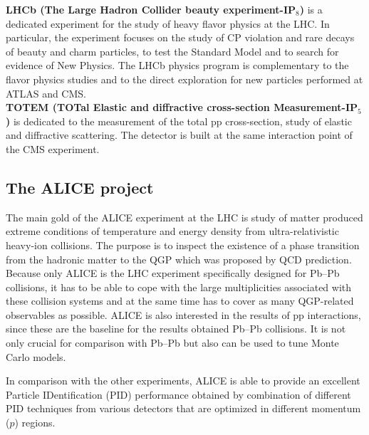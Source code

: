 \textbf{LHCb (The Large Hadron Collider beauty experiment-IP$_{8}$)} \cite{cite:proposalLHCb} is a dedicated experiment for the study of heavy flavor physics at the LHC. In particular, the experiment focuses on the study of CP violation and rare decays of beauty and charm particles, to test the Standard Model and to search for evidence of New Physics. The LHCb physics program is complementary to the flavor physics studies and to the direct exploration for new particles performed at ATLAS and CMS. \\


\textbf{TOTEM (TOTal Elastic and diffractive cross-section Measurement-IP$_{5}$)} \cite{cite:proposalTOTEM} is dedicated to the measurement of the total pp cross-section, study of elastic and diffractive scattering. The detector is built at the same interaction point of the CMS experiment. \\

\subsection{The ALICE project}
The main gold of the ALICE experiment at the LHC \cite{cite:ALICE} is study of matter produced extreme conditions of temperature and energy density from ultra-relativistic heavy-ion collisions. The purpose is to inspect the existence of a phase transition from the hadronic matter to the QGP which was proposed by QCD prediction. Because only ALICE is the LHC experiment specifically designed for Pb--Pb collisions, it has to be able to cope with the large multiplicities associated with these collision systems and at the same time has to cover as many QGP-related observables as possible. ALICE is also interested in the results of pp interactions, since these are the baseline for the results obtained Pb--Pb collisions. It is not only crucial for comparison with Pb--Pb but also can be used to tune Monte Carlo models. 

In comparison with the other experiments, ALICE is able to provide an excellent Particle IDentification (PID) performance obtained by combination of different PID techniques from various detectors that are optimized in different momentum ($\ensuremath{p}$) regions.

